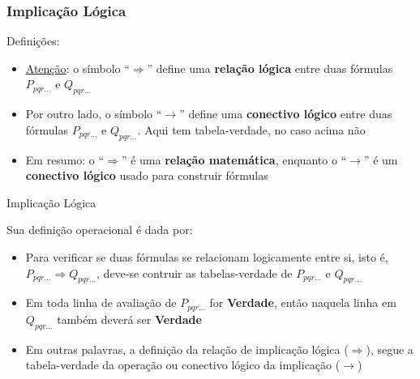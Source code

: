 \begin{frame}[t]%

\frametitle{Implicação Lógica} %

\begin{block}{Definições:}
		\begin{itemize}
		
	
	\item \underline{Atenção}: o símbolo ``$\Rightarrow $'' define uma \textbf{relação lógica}    entre duas 
	fórmulas $P_{pqr\ldots}$ e $Q_{pqr\ldots}$

	\item Por outro lado,  o símbolo ``$\rightarrow $'' define uma \textbf{conectivo lógico} entre duas 
		fórmulas $P_{pqr\ldots}$ e $Q_{pqr\ldots}$. Aqui tem tabela-verdade, no caso acima não
		
		
	\item Em resumo: o ``$\Rightarrow $'' é uma  \textbf{relação	matemática}, enquanto o
	 ``$\rightarrow $'' é  um
	  \textbf{conectivo lógico} usado para construir fórmulas
	
	\end{itemize}

	\end{block}
\end{frame}





\begin{frame}[t]{Implicação Lógica} %



\begin{block}{Sua definição operacional é dada por:}

\begin{itemize}
\item Para verificar se duas fórmulas se relacionam logicamente entre si, isto é, $P_{pqr\ldots} \Rightarrow Q_{pqr\ldots}$, deve-se contruir as tabelas-verdade de $P_{pqr\ldots}$  e $Q_{pqr\ldots}$

\item Em toda linha de  avaliação de $P_{pqr\ldots}$ for \textbf{Verdade}, então naquela linha em $Q_{pqr\ldots}$ também deverá ser \textbf{Verdade}

\item Em outras palavras, a definição da relação de implicação lógica ($\Rightarrow$), segue a tabela-verdade da operação ou conectivo lógico da implicação ($\rightarrow$)
\end{itemize}
\end{block}
\end{frame}

